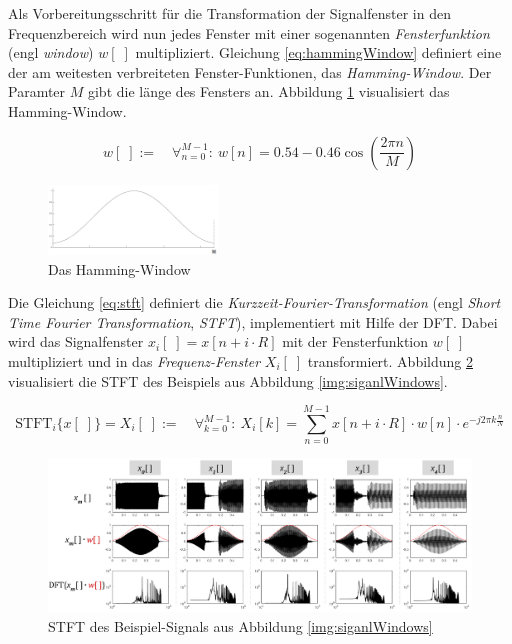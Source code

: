 Als Vorbereitungsschritt für die Transformation der Signalfenster in den Frequenzbereich wird nun jedes Fenster mit einer sogenannten \emph{Fensterfunktion} (engl \emph{window}) $w[\;]$ multipliziert.\cite[S. 69]{sprachverarbeitung} Gleichung \ref{eq:hammingWindow} definiert eine der am weitesten verbreiteten Fenster-Funktionen, das \emph{Hamming-Window}. Der Paramter $M$ gibt die länge des Fensters an. Abbildung \ref{img:hamming} visualisiert das Hamming-Window. \cite[S. 286]{dspGuide}

\begin{equation}
w[\;] := \quad \mathop{\forall}_{n = 0}^{M-1} :\ w[n] = 0.54 - 0.46 \cos(\frac{2\pi n}{M} )
\label{eq:hammingWindow}
\end{equation}

\begin{figure}[h]
	\centering
	\includegraphics[width=0.4\textwidth]{bilder/hamming01.png}
	\caption{Das Hamming-Window}
	\label{img:hamming}
\end{figure}

Die Gleichung \ref{eq:stft} definiert die \emph{Kurzzeit-Fourier-Transformation} (engl \emph{Short Time Fourier Transformation}, \emph{STFT}), implementiert mit Hilfe der DFT. Dabei wird das Signalfenster $x_i[\;] = x[n+i\cdot R]$ mit der Fensterfunktion $w[\;]$ multipliziert und in das \emph{Frequenz-Fenster} $X_i[\;]$ transformiert.\cite[S. 69]{sprachverarbeitung} \cite{stft} Abbildung \ref{img:stft02} visualisiert die STFT des Beispiels aus Abbildung \ref{img:siganlWindows}.

\begin{equation}
\text{STFT}_i\{x[\;]\} = X_i[\;] := \quad \mathop{\forall}_{k = 0}^{M-1} :\ X_i[k] = \sum_{n=0}^{M-1} x[n+i\cdot R] \cdot w[n] \cdot e^{-j 2\pi k \frac{n}{N}}
\label{eq:stft}
\end{equation}

\begin{figure}[h]
	\centering
	\includegraphics[width=1\textwidth]{bilder/stft03.png}
	\caption{STFT des Beispiel-Signals aus Abbildung \ref{img:siganlWindows}}
	\label{img:stft02}
\end{figure}

